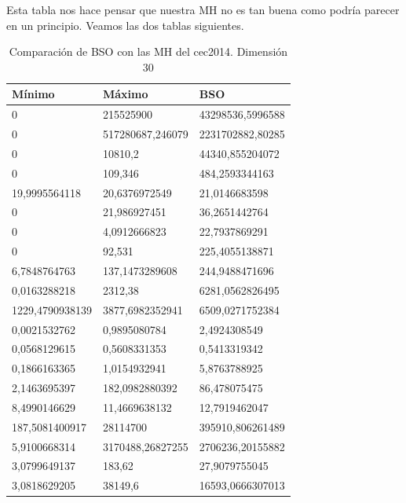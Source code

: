 Esta tabla nos hace pensar que nuestra MH no es tan buena como podría parecer en un principio. Veamos las dos tablas siguientes.

\newpage


\begin{table}[htbp]
	\begin{center}
		\begin{tabular}{|l|l|l|}
			\hline
			Mínimo & Máximo & BSO \\
			\hline \hline
			0 & 215525900 & 43298536,5996588 \\ \hline
			0 & 517280687,246079 & 2231702882,80285\\ \hline
			0 & 10810,2 & 44340,855204072\\ \hline
			0 & 109,346 & 484,2593344163\\ \hline
			19,9995564118 & 20,6376972549 & 21,0146683598\\ \hline
			0 & 21,986927451 & 36,2651442764\\ \hline
			0 & 4,0912666823 & 22,7937869291\\ \hline
			0 & 92,531 & 225,4055138871\\ \hline
			6,7848764763 & 137,1473289608 & 244,9488471696\\ \hline
			0,0163288218 & 2312,38 & 6281,0562826495\\ \hline
			1229,4790938139 & 3877,6982352941 & 6509,0271752384\\ \hline
			0,0021532762 & 0,9895080784 & 2,4924308549\\ \hline
			0,0568129615 & 0,5608331353 & 0,5413319342\\ \hline
			0,1866163365 & 1,0154932941 & 5,8763788925\\ \hline
			2,1463695397 & 182,0982880392 & 86,478075475\\ \hline
			8,4990146629 & 11,4669638132 & 12,7919462047\\ \hline
			187,5081400917 & 28114700 & 395910,806261489\\ \hline
			5,9100668314 & 3170488,26827255 & 2706236,20155882\\ \hline
			3,0799649137 & 183,62 & 27,9079755045\\ \hline
			3,0818629205 & 38149,6 & 16593,0666307013\\ \hline

		\end{tabular}
		\caption{Comparación de BSO con las MH del cec2014. Dimensión 30}
		\label{tabla:Dimension30Comparativa}
	\end{center}
\end{table}

